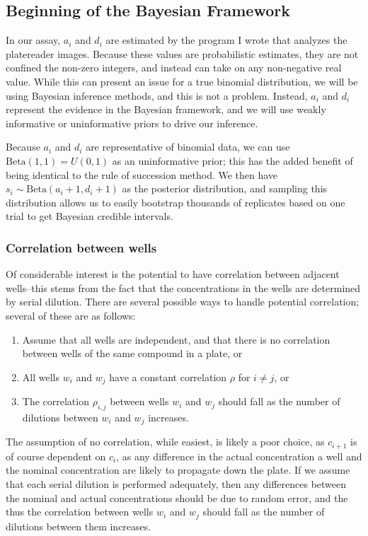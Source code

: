\documentclass[11pt, letterpaper]{article}
\newcommand{\Beta}{\text{Beta}}
\begin{document}
\subsection{Beginning of the Bayesian Framework}
In our assay, $a_i$ and $d_i$ are estimated by the program I wrote that analyzes the platereader images. Because these values are probabilistic estimates, they are not confined the non-zero integers, and instead can take on any non-negative real value. While this can present an issue for a true binomial distribution, we will be using Bayesian inference methods, and this is not a problem. Instead, $a_i$ and $d_i$ represent the evidence in the Bayesian framework, and we will use weakly informative or uninformative priors to drive our inference. 

Because $a_i$ and $d_i$ are representative of binomial data, we can use $\Beta (1,1) = U(0,1)$ as an uninformative prior; this has the added benefit of being identical to the rule of succession method. We then have $s_i \sim \Beta(a_i + 1, d_i +1)$ as the posterior distribution, and sampling this distribution allows us to easily bootstrap thousands of replicates based on one trial to get Bayesian credible intervals. 
\subsubsection{Correlation between wells}
Of considerable interest is the potential to have correlation between adjacent wells--this stems from the fact that the concentrations in the wells are determined by serial dilution. There are several possible ways to handle potential correlation; several of these are as follows: 
\begin{enumerate}
\item Assume that all wells are independent, and that there is no correlation between wells of the same compound in a plate, or
\item All wells $w_i$ and $w_j$ have a constant correlation $\rho$ for $i \neq j$, or
\item The correlation $\rho_{i,j}$ between wells $w_i$ and $w_j$ should fall as the number of dilutions between $w_i$ and $w_j$ increases. 
\end{enumerate}
The assumption of no correlation, while easiest, is likely a poor choice, as $c_{i+1}$ is of course dependent on $c_i$, as any difference in the actual concentration a well and the nominal concentration are likely to propagate down the plate. If we assume that each serial dilution is performed adequately, then any differences between the nominal and actual concentrations should be due to random error, and the thus the correlation between wells $w_i$ and $w_j$ should fall as the number of dilutions between them increases. 
\end{document}
